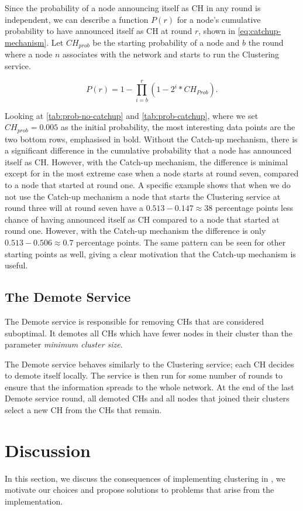 Since the probability of a node announcing itself as CH in any round is independent, we can describe a function $P(r)$ for a node's cumulative probability to have announced itself as CH at round $r$, shown in \cref{eq:catchup-mechanism}. Let $CH_{prob}$ be the starting probability of a node and $b$ the round where a node $n$ associates with the network and starts to run the Clustering service. 

\begin{equation}
\label{eq:catchup-mechanism}
P(r) = 1 - \prod_{i = b}^r (1 - 2^i*CH_{Prob}).   
\end{equation}

Looking at \cref{tab:prob-no-catchup} and \cref{tab:prob-catchup}, where we set $CH_{prob} = 0.005$ as the initial probability, the most interesting data points are the two bottom rows, emphasised in bold. Without the Catch-up mechanism, there is a significant difference in the cumulative probability that a node has announced itself as CH. However, with the Catch-up mechanism, the difference is minimal except for in the most extreme case when a node starts at round seven, compared to a node that started at round one. A specific example shows that when we do not use the Catch-up mechanism a node that starts the Clustering service at round three will at round seven have a $0.513 - 0.147 \approx 38$ percentage points less chance of having announced itself as CH compared to a node that started at round one. However, with the Catch-up mechanism the difference is only $0.513 - 0.506 \approx 0.7$ percentage points. The same pattern can be seen for other starting points as well, giving a clear motivation that the Catch-up mechanism is useful.


\subsection{The Demote Service}
The Demote service is responsible for removing CHs that are considered suboptimal. It demotes all CHs which have fewer nodes in their cluster than the parameter \emph{minimum cluster size}.

The Demote service behaves similarly to the Clustering service; each CH decides to demote itself locally. The service is then run for some number of rounds to ensure that the information spreads to the whole network. At the end of the last Demote service round, all demoted CHs and all nodes that joined their clusters select a new CH from the CHs that remain.

\section{Discussion}
In this section, we discuss the consequences of implementing clustering in \atwo{}, we motivate our choices and propose solutions to problems that arise from the implementation.


